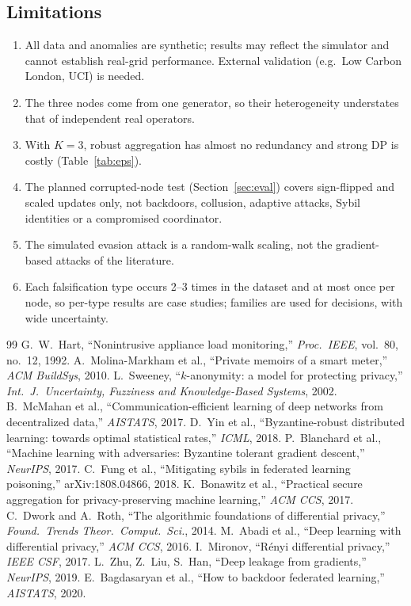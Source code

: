 \documentclass[11pt,a4paper]{article}
\begin{document}
\subsection{Limitations}

\begin{enumerate}
  \item All data and anomalies are synthetic; results may reflect the simulator and cannot establish real-grid performance. External validation (e.g.\ Low Carbon London, UCI) is needed.
  \item The three nodes come from one generator, so their heterogeneity understates that of independent real operators.
  \item With $K=3$, robust aggregation has almost no redundancy and strong DP is costly (Table~\ref{tab:eps}).
  \item The planned corrupted-node test (Section~\ref{sec:eval}) covers sign-flipped and scaled updates only, not backdoors, collusion, adaptive attacks, Sybil identities or a compromised coordinator.
  \item The simulated evasion attack is a random-walk scaling, not the gradient-based attacks of the literature.
  \item Each falsification type occurs 2--3 times in the dataset and at most once per node, so per-type results are case studies; families are used for decisions, with wide uncertainty.
\end{enumerate}

\begin{thebibliography}{99}\small
{} G.~W.~Hart, ``Nonintrusive appliance load monitoring,'' \emph{Proc.\ IEEE}, vol.~80, no.~12, 1992.
 A.~Molina-Markham et al., ``Private memoirs of a smart meter,'' \emph{ACM BuildSys}, 2010.
 L.~Sweeney, ``$k$-anonymity: a model for protecting privacy,'' \emph{Int.\ J.\ Uncertainty, Fuzziness and Knowledge-Based Systems}, 2002.
 B.~McMahan et al., ``Communication-efficient learning of deep networks from decentralized data,'' \emph{AISTATS}, 2017.
 D.~Yin et al., ``Byzantine-robust distributed learning: towards optimal statistical rates,'' \emph{ICML}, 2018.
 P.~Blanchard et al., ``Machine learning with adversaries: Byzantine tolerant gradient descent,'' \emph{NeurIPS}, 2017.
 C.~Fung et al., ``Mitigating sybils in federated learning poisoning,'' arXiv:1808.04866, 2018.
 K.~Bonawitz et al., ``Practical secure aggregation for privacy-preserving machine learning,'' \emph{ACM CCS}, 2017.
 C.~Dwork and A.~Roth, ``The algorithmic foundations of differential privacy,'' \emph{Found.\ Trends Theor.\ Comput.\ Sci.}, 2014.
 M.~Abadi et al., ``Deep learning with differential privacy,'' \emph{ACM CCS}, 2016.
 I.~Mironov, ``R\'enyi differential privacy,'' \emph{IEEE CSF}, 2017.
 L.~Zhu, Z.~Liu, S.~Han, ``Deep leakage from gradients,'' \emph{NeurIPS}, 2019.
 E.~Bagdasaryan et al., ``How to backdoor federated learning,'' \emph{AISTATS}, 2020.
\end{thebibliography}
\end{document}
